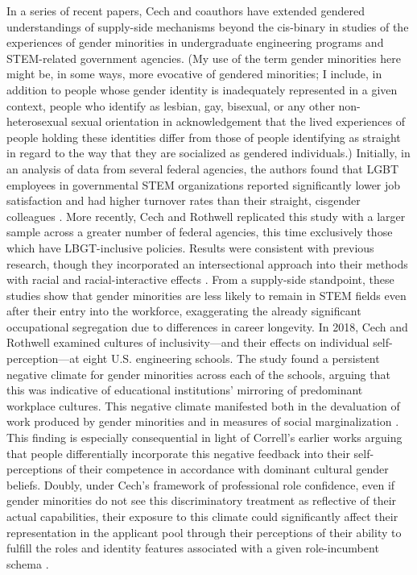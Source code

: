 In a series of recent papers, Cech and coauthors have extended gendered understandings of supply-side mechanisms beyond the cis-binary in studies of the experiences of gender minorities in undergraduate engineering programs and STEM-related government agencies. (My use of the term gender minorities here might be, in some ways, more evocative of gendered minorities; I include, in addition to people whose gender identity is inadequately represented in a given context, people who identify as lesbian, gay, bisexual, or any other non-heterosexual sexual orientation in acknowledgement that the lived experiences of people holding these identities differ from those of people identifying as straight in regard to the way that they are socialized as gendered individuals.) Initially, in an analysis of data from several federal agencies, the authors found that LGBT employees in governmental STEM organizations reported significantly lower job satisfaction and had higher turnover rates than their straight, cisgender colleagues \cite{cech_queer_2017}. More recently, Cech and Rothwell replicated this study with a larger sample across a greater number of federal agencies, this time exclusively those which have LBGT-inclusive policies. Results were consistent with previous research, though they incorporated an intersectional approach into their methods with racial and racial-interactive effects \cite{cech_lgbt_2019}. From a supply-side standpoint, these studies show that gender minorities are less likely to remain in STEM fields even after their entry into the workforce, exaggerating the already significant occupational segregation due to differences in career longevity. In 2018, Cech and Rothwell examined cultures of inclusivity—and their effects on individual self-perception—at eight U.S. engineering schools. The study found a persistent negative climate for gender minorities across each of the schools, arguing that this was indicative of educational institutions’ mirroring of predominant workplace cultures. This negative climate manifested both in the devaluation of work produced by gender minorities and in measures of social marginalization \cite{cech_lgbtq_2018}. This finding is especially consequential in light of Correll’s earlier works arguing that people differentially incorporate this negative feedback into their self-perceptions of their competence in accordance with dominant cultural gender beliefs. Doubly, under Cech’s framework of professional role confidence, even if gender minorities do not see this discriminatory treatment as reflective of their actual capabilities, their exposure to this climate could significantly affect their representation in the applicant pool through their perceptions of their ability to fulfill the roles and identity features associated with a given role-incumbent schema \cite{gorman_gender_2005}.  

